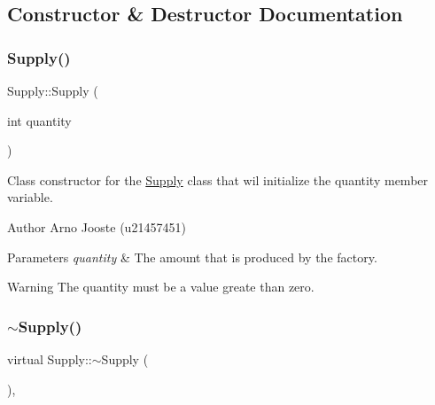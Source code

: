 \subsection{Constructor \& Destructor Documentation}
\mbox{\label{class_supply_a10b11a01cd48bbea678e5be9e7862869}} 
\subsubsection{\texorpdfstring{Supply()}{Supply()}}
{\footnotesize\ttfamily Supply\+::\+Supply (\begin{DoxyParamCaption}\item[{int}]{quantity }\end{DoxyParamCaption})\hspace{0.3cm}{\ttfamily [inline]}}



Class constructor for the \mbox{\hyperlink{class_supply}{Supply}} class that wil initialize the quantity member variable. 

\begin{DoxyAuthor}{Author}
Arno Jooste (u21457451) 
\end{DoxyAuthor}

\begin{DoxyParams}{Parameters}
{\em quantity} & The amount that is produced by the factory. \\
\hline
\end{DoxyParams}
\begin{DoxyWarning}{Warning}
The quantity must be a value greate than zero. 
\end{DoxyWarning}
\mbox{\label{class_supply_a5702fbe83bf5514bbb728eb1e704fcb1}} 
\subsubsection{\texorpdfstring{$\sim$Supply()}{~Supply()}}
{\footnotesize\ttfamily virtual Supply\+::$\sim$\+Supply (\begin{DoxyParamCaption}{ }\end{DoxyParamCaption})\hspace{0.3cm}{\ttfamily [inline]}, {\ttfamily [virtual]}}



